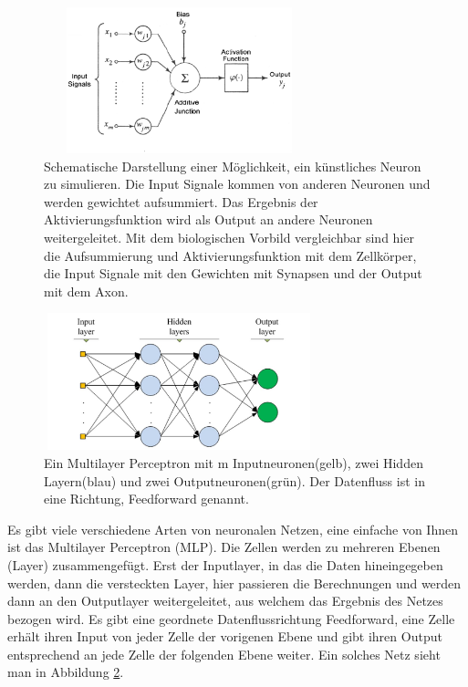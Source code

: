 \begin{figure}
	\centering
	\includegraphics[width=0.7\textwidth, height=160px]{pics/aneuron.png}	
	\caption{Schematische Darstellung einer Möglichkeit, ein künstliches Neuron zu simulieren. Die Input Signale kommen von anderen Neuronen und werden gewichtet aufsummiert. Das Ergebnis der Aktivierungsfunktion wird als Output an andere Neuronen weitergeleitet. Mit dem biologischen Vorbild vergleichbar sind hier die Aufsummierung und Aktivierungsfunktion mit dem Zellkörper, die Input Signale mit den Gewichten mit Synapsen und der Output mit dem Axon.\cite{bib:aneuron}}
	\label{img:aneuron}
\end{figure}
\begin{figure}
	\centering
	\includegraphics[width=0.7\textwidth, height=150px]{pics/mlp.jpg}	
	\caption{Ein Multilayer Perceptron mit m Inputneuronen(gelb), zwei Hidden Layern(blau) und zwei Outputneuronen(grün). Der Datenfluss ist in eine Richtung, Feedforward genannt.  \cite{bib:mlp}}
	\label{img:mlp}
\end{figure}
Es gibt viele verschiedene Arten von neuronalen Netzen, eine einfache von Ihnen ist das Multilayer Perceptron (MLP). Die Zellen werden zu mehreren Ebenen (Layer) zusammengefügt. Erst der Inputlayer, in das die Daten hineingegeben werden, dann die versteckten Layer, hier passieren die Berechnungen und werden dann an den Outputlayer weitergeleitet, aus welchem das Ergebnis des Netzes bezogen wird. Es gibt eine geordnete Datenflussrichtung Feedforward, eine Zelle erhält ihren Input von jeder Zelle der vorigenen Ebene und gibt ihren Output entsprechend an jede Zelle der folgenden Ebene weiter. Ein solches Netz sieht man in Abbildung \ref{img:mlp}.  
